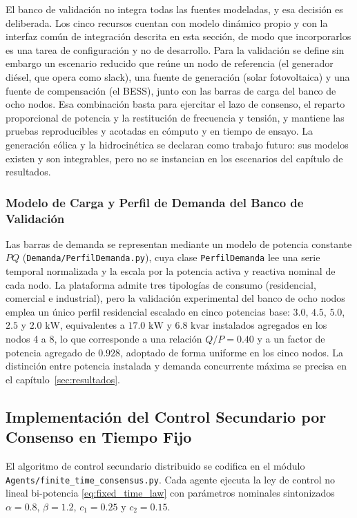 El banco de validación no integra todas las fuentes modeladas, y esa decisión es deliberada. Los cinco recursos cuentan con modelo dinámico propio y con la interfaz común de integración descrita en esta sección, de modo que incorporarlos es una tarea de configuración y no de desarrollo. Para la validación se define sin embargo un escenario reducido que reúne un nodo de referencia (el generador diésel, que opera como slack), una fuente de generación (solar fotovoltaica) y una fuente de compensación (el BESS), junto con las barras de carga del banco de ocho nodos. Esa combinación basta para ejercitar el lazo de consenso, el reparto proporcional de potencia y la restitución de frecuencia y tensión, y mantiene las pruebas reproducibles y acotadas en cómputo y en tiempo de ensayo. La generación eólica y la hidrocinética se declaran como trabajo futuro: sus modelos existen y son integrables, pero no se instancian en los escenarios del capítulo de resultados.

\subsubsection{Modelo de Carga y Perfil de Demanda del Banco de Validación}

Las barras de demanda se representan mediante un modelo de potencia constante $PQ$ (\texttt{Demanda/PerfilDemanda.py}), cuya clase \texttt{PerfilDemanda} lee una serie temporal normalizada y la escala por la potencia activa y reactiva nominal de cada nodo. La plataforma admite tres tipologías de consumo (residencial, comercial e industrial), pero la validación experimental del banco de ocho nodos emplea un único perfil residencial escalado en cinco potencias base: $3.0$, $4.5$, $5.0$, $2.5$ y $2.0\text{ kW}$, equivalentes a $17.0\text{ kW}$ y $6.8\text{ kvar}$ instalados agregados en los nodos 4 a 8, lo que corresponde a una relación $Q/P = 0.40$ y a un factor de potencia agregado de $0.928$, adoptado de forma uniforme en los cinco nodos. La distinción entre potencia instalada y demanda concurrente máxima se precisa en el capítulo~\ref{sec:resultados}.

\subsection{Implementación del Control Secundario por Consenso en Tiempo Fijo}

El algoritmo de control secundario distribuido se codifica en el módulo \texttt{Agents/finite\_time\_consensus.py}. Cada agente ejecuta la ley de control no lineal bi-potencia \eqref{eq:fixed_time_law} con parámetros nominales sintonizados $\alpha = 0.8$, $\beta = 1.2$, $c_1 = 0.25$ y $c_2 = 0.15$.

